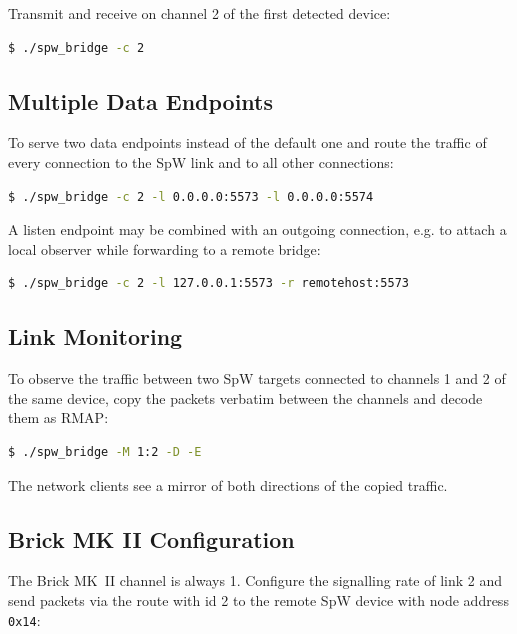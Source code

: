 Transmit and receive on channel 2 of the first detected device:

\begin{lstlisting}[language=bash]
  $ ./spw_bridge -c 2
\end{lstlisting}

\subsection{Multiple Data Endpoints}

To serve two data endpoints instead of the default one and route the traffic
of every connection to the \gls{SpW} link and to all other connections:

\begin{lstlisting}[language=bash]
  $ ./spw_bridge -c 2 -l 0.0.0.0:5573 -l 0.0.0.0:5574
\end{lstlisting}

\noindent
A listen endpoint may be combined with an outgoing connection, e.g. to attach
a local observer while forwarding to a remote bridge:

\begin{lstlisting}[language=bash]
  $ ./spw_bridge -c 2 -l 127.0.0.1:5573 -r remotehost:5573
\end{lstlisting}

\subsection{Link Monitoring}

To observe the traffic between two \gls{SpW} targets connected to channels 1
and 2 of the same device, copy the packets verbatim between the channels and
decode them as \gls{RMAP}:

\begin{lstlisting}[language=bash]
  $ ./spw_bridge -M 1:2 -D -E
\end{lstlisting}

\noindent
The network clients see a mirror of both directions of the copied traffic.

\subsection{Brick MK II Configuration}

The Brick MK~II channel is always 1. Configure the signalling rate of link 2
and send packets via the route with id 2 to the remote \gls{SpW} device with
node address \texttt{0x14}:

